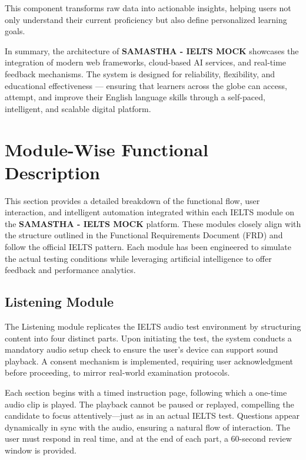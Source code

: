 \documentclass[a4paper,12pt]{article}
\begin{document}
This component transforms raw data into actionable insights, helping users not only understand their current proficiency but also define personalized learning goals.

\vspace{0.5cm}

\noindent
In summary, the architecture of \textbf{SAMASTHA - IELTS MOCK} showcases the integration of modern web frameworks, cloud-based AI services, and real-time feedback mechanisms. The system is designed for reliability, flexibility, and educational effectiveness — ensuring that learners across the globe can access, attempt, and improve their English language skills through a self-paced, intelligent, and scalable digital platform.


\newpage
\section{Module-Wise Functional Description}

\vspace{0.5cm}

This section provides a detailed breakdown of the functional flow, user interaction, and intelligent automation integrated within each IELTS module on the \textbf{SAMASTHA - IELTS MOCK} platform. These modules closely align with the structure outlined in the Functional Requirements Document (FRD) and follow the official IELTS pattern. Each module has been engineered to simulate the actual testing conditions while leveraging artificial intelligence to offer feedback and performance analytics.

\vspace{0.4cm}
\subsection{Listening Module}

The Listening module replicates the IELTS audio test environment by structuring content into four distinct parts. Upon initiating the test, the system conducts a mandatory audio setup check to ensure the user’s device can support sound playback. A consent mechanism is implemented, requiring user acknowledgment before proceeding, to mirror real-world examination protocols.

Each section begins with a timed instruction page, following which a one-time audio clip is played. The playback cannot be paused or replayed, compelling the candidate to focus attentively—just as in an actual IELTS test. Questions appear dynamically in sync with the audio, ensuring a natural flow of interaction. The user must respond in real time, and at the end of each part, a 60-second review window is provided.
\end{document}
